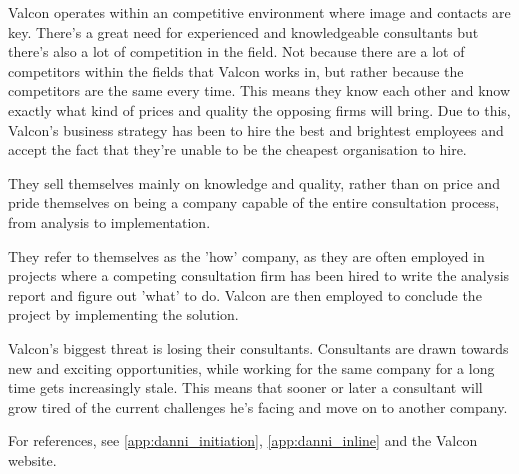 \label{app:valcon_environment}
Valcon operates within an competitive environment where image and contacts are key. 
There's a great need for experienced and knowledgeable consultants but there's also a lot of competition in the field.
Not because there are a lot of competitors within the fields that Valcon works in, but rather because the competitors are the same every time.
This means they know each other and know exactly what kind of prices and quality the opposing firms will bring.
Due to this, Valcon's business strategy has been to hire the best and brightest employees and accept the fact that they're unable to be the cheapest organisation to hire.

They sell themselves mainly on knowledge and quality, rather than on price and pride themselves on being a company capable of the entire consultation process, from analysis to implementation.

They refer to themselves as the 'how' company, as they are often employed in projects where a competing consultation firm has been hired to write the analysis report and figure out 'what' to do. 
Valcon are then employed to conclude the project by implementing the solution.

Valcon's biggest threat is losing their consultants.
Consultants are drawn towards new and exciting opportunities, while working for the same company for a long time gets increasingly stale.
This means that sooner or later a consultant will grow tired of the current challenges he's facing and move on to another company.

For references, see \ref{app:danni_initiation}, \ref{app:danni_inline} and the Valcon website.